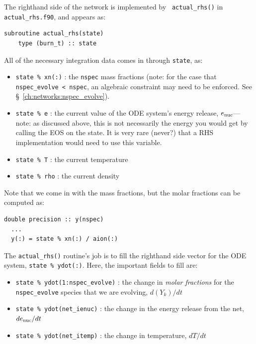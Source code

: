 The righthand side of the network is implemented by {\tt
  actual\_rhs()} in {\tt actual\_rhs.f90}, and appears as:
\begin{lstlisting}[language={[95]fortran}]
  subroutine actual_rhs(state)
    type (burn_t) :: state
\end{lstlisting}

All of the necessary integration data comes in through {\tt state}, as:
\begin{itemize}
\item {\tt state \% xn(:)} : the {\tt nspec} mass fractions (note: for
  the case that {\tt nspec\_evolve < nspec}, an algebraic constraint
  may need to be enforced.  See \S~\ref{ch:networks:nspec_evolve}).

\item {\tt state \% e} : the current value of the ODE system's energy
  release, ${{{e}_\mathrm{nuc}}}$---note: as discussed above, this is not necessarily
  the energy you would get by calling the EOS on the state.  It is
  very rare (never?)  that a RHS implementation would need to use this
  variable.

\item {\tt state \% T} : the current temperature

\item {\tt state \% rho} : the current density
\end{itemize}
Note that we come in with the mass fractions, but the molar fractions can
be computed as:
\begin{lstlisting}[language={[95]fortran}]
  double precision :: y(nspec)
  ...
  y(:) = state % xn(:) / aion(:)
\end{lstlisting}

The {\tt actual\_rhs()} routine's job is to fill the righthand side vector
for the ODE system, {\tt state \% ydot(:)}.  Here, the important
fields to fill are:
\begin{itemize}
\item {\tt state \% ydot(1:nspec\_evolve)} : the change in {\em molar
  fractions} for the {\tt nspec\_evolve} species that we are evolving,
  $d({Y}_k)/dt$

\item {\tt state \% ydot(net\_ienuc)} : the change in the energy release
  from the net, $d{{{e}_\mathrm{nuc}}}/dt$

\item {\tt state \% ydot(net\_itemp)} : the change in temperature, $dT/dt$
\end{itemize}

